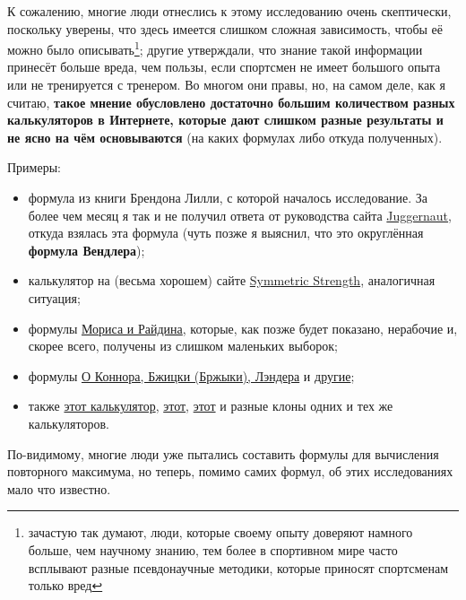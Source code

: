 \documentclass[
]{article}
\begin{document}
К сожалению, многие люди отнеслись к этому исследованию очень
скептически, поскольку уверены, что здесь имеется слишком сложная
зависимость, чтобы её можно было описывать\footnote{зачастую так думают,
  люди, которые своему опыту доверяют намного больше, чем научному
  знанию, тем более в спортивном мире часто всплывают разные
  псевдонаучные методики, которые приносят спортсменам только вред};
другие утверждали, что знание такой информации принесёт больше вреда,
чем пользы, если спортсмен не имеет большого опыта или не тренируется с
тренером. Во многом они правы, но, на самом деле, как я считаю,
\textbf{такое мнение обусловлено достаточно большим количеством разных
калькуляторов в Интернете, которые дают слишком разные результаты и не
ясно на чём основываются} (на каких формулах либо откуда полученных).

Примеры:

\begin{itemize}
\item
  формула из книги Брендона Лилли, с которой началось исследование. За
  более чем месяц я так и не получил ответа от руководства сайта
  \href{https://www.jtsstrength.com}{Juggernaut}, откуда взялась эта
  формула (чуть позже я выяснил, что это округлённая \textbf{формула
  Вендлера});
\item
  калькулятор на (весьма хорошем) сайте
  \href{https://symmetricstrength.com}{Symmetric Strength}, аналогичная
  ситуация;
\item
  формулы
  \href{https://power-fitness.ru/metod-morisa-i-rajdina-ili-kak-uznat-svoj-maksimum-v-zhime-lezha.html}{Мориса
  и Райдина}, которые, как позже будет показано, нерабочие и, скорее
  всего, получены из слишком маленьких выборок;
\item
  формулы \href{http://frs24.ru/st/maksimum-v-zhime-lezha-raschet/}{О
  Коннора, Бжицки (Бржыки), Лэндера} и
  \href{https://ru.wikipedia.org/wiki/Одно_повторение_с_максимальным_весом}{другие};
\item
  также \href{https://powerliftingrating.ru/repeat_calculator}{этот
  калькулятор},
  \href{http://evgeniyfit.ru/fitnes-kalkulyatoryi/odnopovtornyiy-maksimum-online/}{этот},
  \href{https://body1.ru/kalkulyator-odnopovtornogo-maksimuma-1pm/}{этот}
  и разные клоны одних и тех же калькуляторов.
\end{itemize}

По-видимому, многие люди уже пытались составить формулы для вычисления
повторного максимума, но теперь, помимо самих формул, об этих
исследованиях мало что известно.
\end{document}
